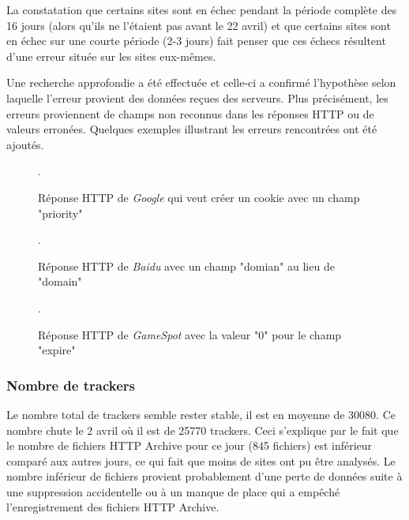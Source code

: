 La constatation que certains sites sont en échec pendant la période complète des 16 jours (alors qu'ils ne l'étaient pas avant le 22 avril) et que certains sites sont en échec sur une courte période (2-3 jours) fait penser que ces échecs résultent d'une erreur située sur les sites eux-mêmes.
\newline

Une recherche approfondie a été effectuée et celle-ci a confirmé l'hypothèse selon laquelle l'erreur provient des données reçues des serveurs. Plus précisément, les erreurs proviennent de champs non reconnus dans les réponses HTTP ou de valeurs erronées. Quelques exemples illustrant les erreurs rencontrées ont été ajoutés.
\newline

\begin{figure}[h]
	\centering
	
	\caption{\label{bad_field_google}Réponse HTTP de \textit{Google} qui veut créer un cookie avec un champ "priority"}.
\end{figure}

\begin{figure}[h]
	\centering
	
	\caption{\label{bad_field_baidu}Réponse HTTP de \textit{Baidu} avec un champ "domian" au lieu de "domain"}.
\end{figure}

\begin{figure}[h]
	\centering
	
	\caption{\label{bad_field_gamespot}Réponse HTTP de \textit{GameSpot} avec la valeur "0" pour le champ "expire"}.
\end{figure}

\subsubsection{Nombre de trackers}
Le nombre total de trackers semble rester stable, il est en moyenne de 30080. Ce nombre chute le 2 avril où il est de 25770 trackers. Ceci s'explique par le fait que le nombre de fichiers HTTP Archive pour ce jour (845 fichiers) est inférieur comparé aux autres jours, ce qui fait que moins de sites ont pu être analysés. Le nombre inférieur de fichiers provient probablement d'une perte de données suite à une suppression accidentelle ou à un manque de place qui a empêché l'enregistrement des fichiers HTTP Archive.

